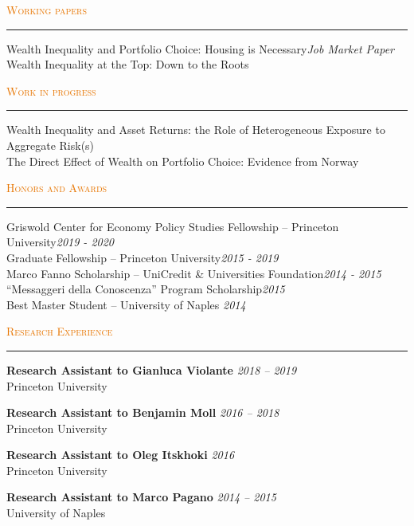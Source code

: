 \documentclass{resume} %
\renewenvironment{rSection}[1]{
\sectionskip
\textcolor[HTML]{e77500}{\textsc{#1}}
\sectionlineskip
\hrule
\begin{list}{}{
\setlength{\leftmargin}{1.5em}
}
\item[]
}{
\end{list}
}
\begin{document}
\begin{rSection}{Working papers}

{Wealth Inequality and Portfolio Choice: Housing is Necessary}\hfill {\em Job Market Paper} \\

{Wealth Inequality at the Top: Down to the Roots}\hfill {}
\end{rSection}


\begin{rSection}{Work in progress}

{Wealth Inequality and Asset Returns: the Role of Heterogeneous Exposure to Aggregate Risk(s)}\hfill {} \\

{The Direct Effect of Wealth on Portfolio Choice: Evidence from Norway}\hfill {}
\end{rSection}


\begin{rSection}{Honors and Awards} \itemsep -2pt

{Griswold Center for Economy Policy Studies Fellowship -- Princeton University}\hfill {\em 2019 - 2020} \\
{Graduate Fellowship -- Princeton University}\hfill {\em 2015 - 2019} \\
{Marco Fanno Scholarship -- UniCredit \& Universities Foundation}\hfill {\em 2014 - 2015} \\
{``Messaggeri della Conoscenza'' Program Scholarship}\hfill {\em 2015} \\
{Best Master Student -- University of Naples} \hfill {\em 2014}
\end{rSection}
\newpage 


\begin{rSection}{Research Experience}

{\bf Research Assistant to Gianluca Violante} \hfill {\em 2018 -- 2019} \\
Princeton University

{\bf Research Assistant to Benjamin Moll} \hfill {\em 2016 -- 2018} \\
Princeton University

{\bf Research Assistant to Oleg Itskhoki} \hfill {\em 2016} \\
Princeton University

{\bf Research Assistant to Marco Pagano} \hfill {\em 2014 -- 2015} \\
University of Naples

\end{rSection}
\end{document}

